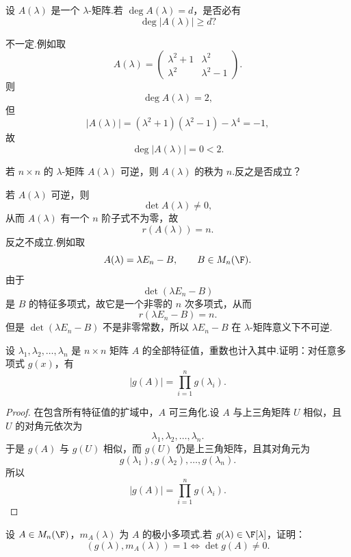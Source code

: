 \begin{problem}[16]
	设 $A(\lambda)$ 是一个 $\lambda$-矩阵.若 $\deg A(\lambda)=d$，是否必有
	\[
	\deg |A(\lambda)|\geq d?
	\]
\end{problem}

\begin{solution}
	不一定.例如取
	\[
	A(\lambda)=
	\begin{pmatrix}
		\lambda^2+1&\lambda^2\\
		\lambda^2&\lambda^2-1
	\end{pmatrix}.
	\]
	则
	\[
	\deg A(\lambda)=2,
	\]
	但
	\[
	|A(\lambda)|=(\lambda^2+1)(\lambda^2-1)-\lambda^4=-1,
	\]
	故
	\[
	\deg |A(\lambda)|=0<2.
	\]
\end{solution}

\begin{problem}[17]
	若 $n\times n$ 的 $\lambda$-矩阵 $A(\lambda)$ 可逆，则 $A(\lambda)$ 的秩为 $n$.反之是否成立？
\end{problem}

\begin{solution}
	若 $A(\lambda)$ 可逆，则
	\[
	\det A(\lambda)\neq0,
	\]
	从而 $A(\lambda)$ 有一个 $n$ 阶子式不为零，故
	\[
	r(A(\lambda))=n.
	\]
	反之不成立.例如取
	\[
	A(\lambda)=\lambda E_n-B,
	\qquad B\in M_n(\F).
	\]
	由于
	\[
	\det(\lambda E_n-B)
	\]
	是 $B$ 的特征多项式，故它是一个非零的 $n$ 次多项式，从而
	\[
	r(\lambda E_n-B)=n.
	\]
	但是 $\det(\lambda E_n-B)$ 不是非零常数，所以 $\lambda E_n-B$ 在 $\lambda$-矩阵意义下不可逆.
\end{solution}

\begin{problem}[34]
	设 $\lambda_1,\lambda_2,\ldots,\lambda_n$ 是 $n\times n$ 矩阵 $A$ 的全部特征值，重数也计入其中.证明：对任意多项式 $g(x)$，有
	\[
	|g(A)|=\prod_{i=1}^n g(\lambda_i).
	\]
\end{problem}

\begin{proof}
	在包含所有特征值的扩域中，$A$ 可三角化.设 $A$ 与上三角矩阵 $U$ 相似，且 $U$ 的对角元依次为
	\[
	\lambda_1,\lambda_2,\ldots,\lambda_n.
	\]
	于是 $g(A)$ 与 $g(U)$ 相似，而 $g(U)$ 仍是上三角矩阵，且其对角元为
	\[
	g(\lambda_1),g(\lambda_2),\ldots,g(\lambda_n).
	\]
	所以
	\[
	|g(A)|=\prod_{i=1}^n g(\lambda_i).
	\]
\end{proof}

\begin{problem}[45]
	设 $A\in M_n(\F)$，$m_A(\lambda)$ 为 $A$ 的极小多项式.若 $g(\lambda)\in\F[\lambda]$，证明：
	\[
	(g(\lambda),m_A(\lambda))=1
	\Longleftrightarrow
	\det g(A)\neq0.
	\]
\end{problem}

